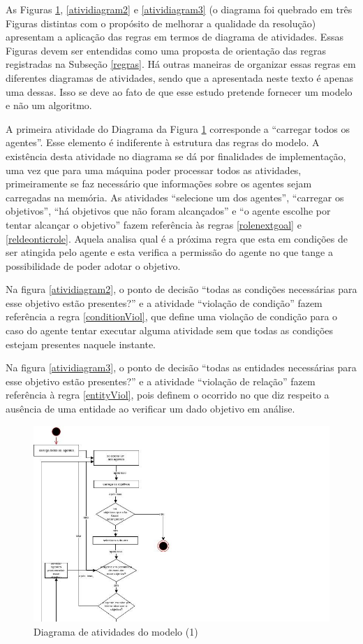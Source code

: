 As Figuras \ref{atividiagram1}, \ref{atividiagram2} e \ref{atividiagram3} (o diagrama foi quebrado em três Figuras distintas com o propósito de melhorar a qualidade da resolução)  apresentam a aplicação das regras em termos de diagrama de atividades. Essas Figuras devem ser entendidas como uma proposta de orientação das regras registradas na Subseção \ref{regras}. Há outras maneiras de organizar essas regras em diferentes diagramas de atividades, sendo que a apresentada neste texto é apenas uma dessas. Isso se deve ao fato de que esse estudo pretende fornecer um modelo e não um algoritmo. 

A primeira atividade do Diagrama da Figura \ref{atividiagram1} corresponde a ``carregar todos os agentes''. Esse elemento é indiferente à estrutura das regras do modelo. A existência desta atividade no diagrama se dá por finalidades de implementação, uma vez que para uma máquina poder processar todos as atividades, primeiramente se faz necessário que informações sobre os agentes sejam carregadas na memória. As atividades ``selecione um dos agentes'', ``carregar os objetivos'', ``há objetivos que não foram alcançados'' e ``o agente escolhe por tentar alcançar o objetivo'' fazem referência às regras \ref{rolenextgoal} e \ref{reldeonticrole}. Aquela analisa qual é a próxima regra que esta em condições de ser atingida pelo agente e esta verifica a permissão do agente no que tange a possibilidade de poder adotar o objetivo. 

Na figura \ref{atividiagram2}, o ponto de decisão ``todas as condições necessárias para esse objetivo estão presentes?'' e a atividade ``violação de condição'' fazem referência a regra \ref{conditionViol}, que define uma violação de condição para o caso do agente tentar executar alguma atividade sem que todas as condições estejam presentes naquele instante.

Na figura \ref{atividiagram3}, o ponto de decisão ``todas as entidades necessárias para esse objetivo estão presentes?'' e a atividade ``violação de relação'' fazem referência à regra \ref{entityViol}, pois definem o ocorrido no que diz respeito a ausência de uma entidade ao verificar um dado objetivo em análise. 

\begin{figure}[H]
  \centering
  \includegraphics[width=1.1\linewidth]{figure/diag1.jpg} 
  \caption{Diagrama de atividades do modelo (1)}
  \label{atividiagram1}
\end{figure}


